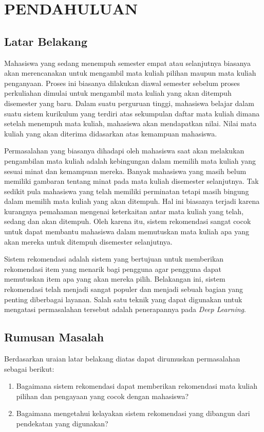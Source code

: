 \chapter{PENDAHULUAN}

\section{Latar Belakang}

Mahasiswa yang sedang menempuh semester empat atau selanjutnya biasanya akan merencanakan untuk mengambil
mata kuliah pilihan maupun mata kuliah penganyaan. Proses ini biasanya dilakukan diawal semester sebelum proses perkuliahan
dimulai untuk mengambil mata kuliah yang akan ditempuh disemester yang baru. Dalam suatu perguruan tinggi, mahasiswa belajar dalam suatu
sistem kurikulum yang terdiri atas sekumpulan daftar mata kuliah dimana setelah menempuh mata kuliah,
mahasiswa akan mendapatkan nilai. Nilai mata kuliah yang akan diterima didasarkan atas kemampuan
mahasiswa.

Permasalahan yang biasanya dihadapi oleh mahasiswa saat akan melakukan pengambilan mata kuliah adalah kebingungan dalam
memilih mata kuliah yang sesuai minat dan kemampuan mereka. Banyak mahasiswa yang masih belum memiliki gambaran tentang
minat pada mata kuliah disemester selanjutnya. Tak sedikit pula mahasiswa yang telah memiliki perminatan tetapi masih
bingung dalam memilih mata kuliah yang akan ditempuh. Hal ini biasanya terjadi karena kurangnya pemahaman mengenai
keterkaitan antar mata kuliah yang telah, sedang dan akan ditempuh. Oleh karena itu, sistem rekomendasi sangat cocok untuk
dapat membantu mahasiswa dalam memutuskan mata kuliah apa yang akan mereka untuk ditempuh disemester selanjutnya.

Sistem rekomendasi adalah sistem yang bertujuan untuk memberikan rekomendasi item yang menarik bagi pengguna agar pengguna
dapat memutuskan item apa yang akan mereka pilih. Belakangan ini, sistem rekomendasi telah menjadi sangat populer dan menjadi
sebuah bagian yang penting diberbagai layanan. Salah satu teknik yang dapat digunakan untuk mengatasi permasalahan tersebut adalah
penerapannya pada \emph{Deep Learning}.

\section{Rumusan Masalah}
Berdasarkan uraian latar belakang diatas dapat dirumuskan permasalahan sebagai berikut:
\begin{enumerate}[noitemsep]
      \item Bagaimana sistem rekomendasi dapat memberikan rekomendasi mata kuliah pilihan dan pengayaan
            yang cocok dengan mahasiswa?
      \item Bagaimana mengetahui kelayakan sistem rekomendasi yang dibangun dari pendekatan yang digunakan?
\end{enumerate}

